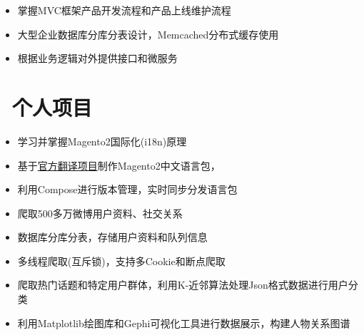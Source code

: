 \documentclass{resume}
\begin{document}
    \begin{onehalfspacing}
        \begin{itemize}
            \item 掌握MVC框架产品开发流程和产品上线维护流程
            \item 大型企业数据库分库分表设计，Memcached分布式缓存使用
            \item 根据业务逻辑对外提供接口和微服务
        \end{itemize}
    \end{onehalfspacing}
    \blankline{ }

    \section{\faBriefcase\ 个人项目}
    \begin{onehalfspacing}
        \begin{itemize}
            \item 学习并掌握Magento2国际化(i18n)原理
            \item 基于\href{https://crowdin.com/project/magento-2/zh-CN}{官方翻译项目}制作Magento2中文语言包，
            \item 利用Compose进行版本管理，实时同步分发语言包
        \end{itemize}
    \end{onehalfspacing}

    \begin{onehalfspacing}
        \begin{itemize}
            \item 爬取500多万微博用户资料、社交关系
            \item 数据库分库分表，存储用户资料和队列信息
            \item 多线程爬取(互斥锁)，支持多Cookie和断点爬取
            \item 爬取热门话题和特定用户群体，利用K-近邻算法处理Json格式数据进行用户分类
            \item 利用Matplotlib绘图库和Gephi可视化工具进行数据展示，构建人物关系图谱
        \end{itemize}
    \end{onehalfspacing}
\end{document}

